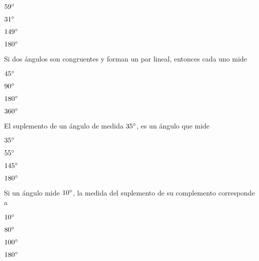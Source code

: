 \documentclass[12pt, fleqn]{article}
\begin{document}
\benu
\item[] \opc $59^\circ$\vf
\item[] \opc $31^\circ$\vf
\item[] \opc $149^\circ$\vf
\item[] \opc $180^\circ$
\eenu
\vs

\item Si dos ángulos son congruentes y forman un par lineal, entonces cada uno mide \vp

\benu
\item[] \opc $45^\circ$ \vf
\item[] \opc $90^\circ$ \vf
\item[] \opc $180^\circ$ \vf
\item[] \opc $360^\circ$
\eenu\vs

\item El suplemento de un ángulo de medida $35^\circ$, es un ángulo que mide \vp

\benu
\item[] \opc $35^\circ$ \vf
\item[] \opc $55^\circ$ \vf
\item[] \opc $145^\circ$ \vf
\item[] \opc $180^\circ$
\eenu\vs

\item Si un ángulo mide $10^\circ$, la medida del suplemento de su complemento corresponde a \vp

\benu
\item[] \opc $10^\circ$ \vf
\item[] \opc $80^\circ$ \vf
\item[] \opc $100^\circ$ \vf
\item[] \opc $180^\circ$
\eenu

\pagebreak
\end{document}
